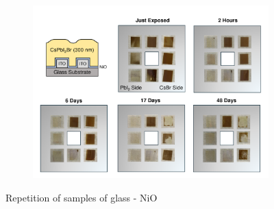 \begin{figure}[htbp]
    \centering
    \begin{subfigure}[t]{0.99\textwidth}
        \centering
        \includegraphics[width=\textwidth]{chapters/appendixB/images/Stability_No_Rotation_275_on_nio_repeated.pdf} %
             
    \end{subfigure}

    \caption{Repetition of samples of glass - NiO}
    \label{fig:appendix:stability_on_NiO_v2}
\end{figure}

\cleardoublepage

